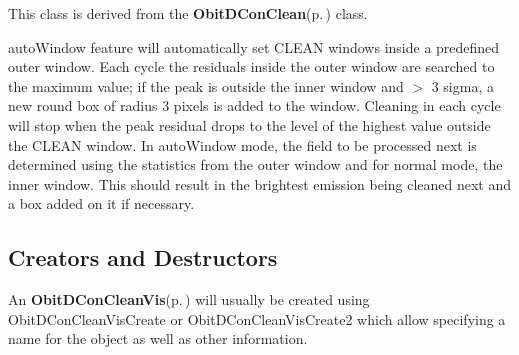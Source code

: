 This class is derived from the {\bf Obit\-DCon\-Clean}{\rm (p.\,\pageref{structObitDConClean})} class.

auto\-Window feature will automatically set CLEAN windows inside a predefined outer window. Each cycle the residuals inside the outer window are searched to the maximum value; if the peak is outside the inner window and $>$ 3 sigma, a new round box of radius 3 pixels is added to the window. Cleaning in each cycle will stop when the peak residual drops to the level of the highest value outside the CLEAN window. In auto\-Window mode, the field to be processed next is determined using the statistics from the outer window and for normal mode, the inner window. This should result in the brightest emission being cleaned next and a box added on it if necessary.\subsection{Creators and Destructors}\label{ObitDConCleanVis_8h_ObitDConCleanVisaccess}
An {\bf Obit\-DCon\-Clean\-Vis}{\rm (p.\,\pageref{structObitDConCleanVis})} will usually be created using Obit\-DCon\-Clean\-Vis\-Create or Obit\-DCon\-Clean\-Vis\-Create2 which allow specifying a name for the object as well as other information.

